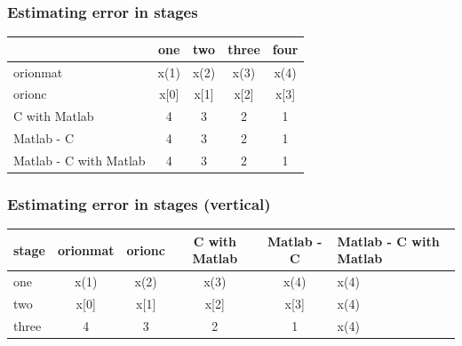 \documentclass{beamer}
\begin{document}
\begin{frame}\frametitle{Estimating error in stages}
        \centering
	\begin{tabular}{|p{2cm}|c|c|c|c|}
		\toprule
                                         & one                    & two                    & three                  & four                   \\%
		\midrule
                  \hline
                  \gls{orionmat}         & \cellcolor{langM} x(1) & \cellcolor{langM} x(2) & \cellcolor{langM} x(3) & \cellcolor{langM} x(4) \\%
                  \gls{orionc}           & \cellcolor{langC} x[0] & \cellcolor{langC} x[1] & \cellcolor{langC} x[2] & \cellcolor{langC} x[3] \\%
                  C with Matlab          & \cellcolor{langCM} 4   & \cellcolor{langCM} 3   & \cellcolor{langCM} 2   & \cellcolor{langCM} 1   \\%

                  Matlab - C             & \cellcolor{diffone} 4  & \cellcolor{diffone} 3  & \cellcolor{diffone} 2  & \cellcolor{diffone} 1  \\%
                  Matlab - C with Matlab & \cellcolor{difftwo} 4  & \cellcolor{difftwo} 3  & \cellcolor{difftwo} 2  & \cellcolor{difftwo} 1  \\%
		  \bottomrule
        \end{tabular}
\end{frame}



\begin{frame}\frametitle{Estimating error in stages (vertical)}
        \centering
        \begin{tabular}{|l|c|c|c|c|}
		stage  & \gls{orionmat}         & \gls{orionc}           & C with Matlab           & Matlab - C               & Matlab - C with Matlab   \\ \hline
		\hline
		one    &  x(1) &  x(2) &  x(3) &  x(4) &  x(4) \\ \hline
		two    &  x[0] &  x[1] &  x[2] &  x[3] &  x(4) \\ \hline
		three  &  4    &  3    &  2    &  1    &  x(4) \\ \hline

        \end{tabular}
        \note{
        }
\end{frame}
\end{document}
